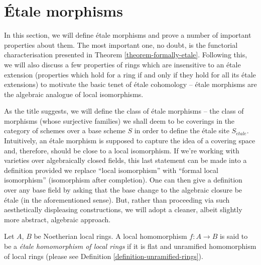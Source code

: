 \section{\'Etale morphisms}
\label{section-etale-morphisms}

\noindent
In this section, we will define \'etale morphisms and prove a number of
important properties about them. The most important one, no doubt, is the
functorial characterisation presented in Theorem \ref{theorem-formally-etale}.
Following this, we will also discuss a few properties of rings which are
insensitive to an \'etale extension (properties which hold for a ring
if and only if they hold for all its \'etale extensions) to motivate the basic
tenet of \'etale cohomology -- \'etale morphisms are the algebraic analogue of
local isomorphisms.

\medskip\noindent
As the title suggests, we will define the class of \'etale morphisms -- the
class of morphisms (whose surjective families) we shall deem to be coverings
in the category of schemes over a base scheme $S$ in order to define the
\'etale site $S_{\acute{e}tale}$. Intuitively, an \'etale morphism is supposed
to capture the idea of a covering space and, therefore, should be close to a
local isomorphism. If we're working with varieties over algebraically closed
fields, this last statement can be made into a definition provided we replace
``local isomorphism'' with ``formal local isomorphism'' (isomorphism after
completion). One can then give a definition over any base field by asking
that the base change to the algebraic closure be \'etale (in the
aforementioned sense). But, rather than proceeding via such aesthetically
displeasing constructions, we will adopt a cleaner, albeit slightly more
abstract, algebraic approach.

\begin{definition}
\label{definition-etale-ring}
Let $A$, $B$ be Noetherian local rings.
A local homomorphism $f : A \to B$ is said to be a
{\it \'etale homomorphism of local rings}
if it is flat and unramified homomorphism of local rings
(please see Definition \ref{definition-unramified-rings}).
\end{definition}

